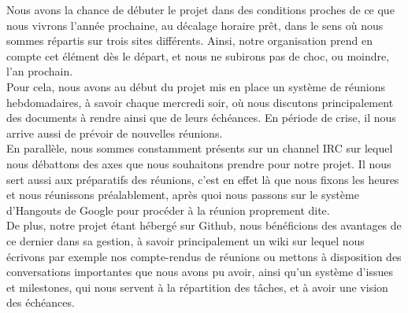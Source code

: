 Nous avons la chance de débuter le projet dans des conditions proches de ce que nous vivrons l'année prochaine, au décalage horaire prêt, dans le sens où nous sommes répartis sur trois sites différents. Ainsi, notre organisation prend en compte cet élément dès le départ, et nous ne subirons pas de choc, ou moindre, l'an prochain.\\

Pour cela, nous avons au début du projet mis en place un système de réunions hebdomadaires, à savoir chaque mercredi soir, où nous discutons principalement des documents à rendre ainsi que de leurs échéances. En période de crise, il nous arrive aussi de prévoir de nouvelles réunions.\\

En parallèle, nous sommes constamment présents sur un channel IRC sur lequel nous débattons des axes que nous souhaitons prendre pour notre projet. Il nous sert aussi aux préparatifs des réunions, c'est en effet là que nous fixons les heures et nous réunissons préalablement, après quoi nous passons sur le système d'Hangouts de Google pour procéder à la réunion proprement dite.\\

De plus, notre projet étant hébergé sur Github, nous bénéficions des avantages de ce dernier dans sa gestion, à savoir principalement un wiki sur lequel nous écrivons par exemple nos compte-rendus de réunions ou mettons à disposition des conversations importantes que nous avons pu avoir, ainsi qu'un système d'issues et milestones, qui nous servent à la répartition des tâches, et à avoir une vision des échéances.